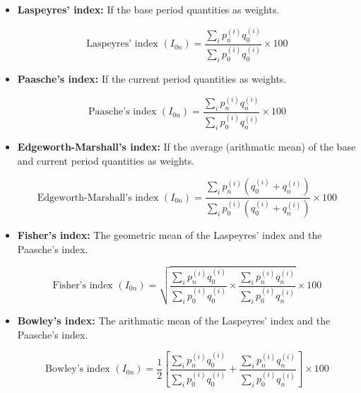 \documentclass[twoside]{book}
\begin{document}
\begin{itemize}
\item \textbf{Laspeyres' index:} If the base period quantities as weights.
\begin{textbox}
\begin{equation*}
    \text{Laspeyres' index } (I_{0n}) = \frac{\displaystyle\sum_i p_n^{(i)} q_0^{(i)}}{\displaystyle\sum_i p_0^{(i)} q_0^{(i)}} \times 100
\end{equation*}
\end{textbox}

\item \textbf{Paasche's index:} If the current period quantities as weights.
\begin{textbox}
\begin{equation*}
    \text{Paasche's index } (I_{0n}) = \frac{\displaystyle\sum_i p_n^{(i)} q_n^{(i)}}{\displaystyle\sum_i p_0^{(i)} q_n^{(i)}} \times 100
\end{equation*}
\end{textbox}

\item \textbf{Edgeworth-Marshall's index:} If the average (arithmatic mean) of the base and current period quantities as weights.
\begin{textbox}
\begin{equation*}
    \text{Edgeworth-Marshall's index } (I_{0n}) =
    \frac{\displaystyle\sum_i p_n^{(i)} (q_0^{(i)} + q_n^{(i)})}
         {\displaystyle\sum_i p_0^{(i)} (q_0^{(i)} + q_n^{(i)})} \times 100
\end{equation*}
\end{textbox}

\item \textbf{Fisher's index:} The geometric mean of the Laspeyres' index and the Paasche's index.
\begin{textbox}
\begin{equation*}
    \text{Fisher's index } (I_{0n}) = \sqrt{\frac{\displaystyle\sum_i p_n^{(i)} q_0^{(i)}}{\displaystyle\sum_i p_0^{(i)} q_0^{(i)}} \times \frac{\displaystyle\sum_i p_n^{(i)} q_n^{(i)}}{\displaystyle\sum_i p_0^{(i)} q_n^{(i)}}} \times 100
\end{equation*}
\end{textbox}

\item \textbf{Bowley's index:} The arithmatic mean of the Laspeyres' index and the Paasche's index.
\begin{textbox}
\begin{equation*}
    \text{Bowley's index } (I_{0n}) = \dfrac{1}{2}\left[\frac{\displaystyle\sum_i p_n^{(i)} q_0^{(i)}}{\displaystyle\sum_i p_0^{(i)} q_0^{(i)}} +  \frac{\displaystyle\sum_i p_n^{(i)} q_n^{(i)}}{\displaystyle\sum_i p_0^{(i)} q_n^{(i)}}\right] \times 100
\end{equation*}
\end{textbox}


\end{itemize}
\end{document}
